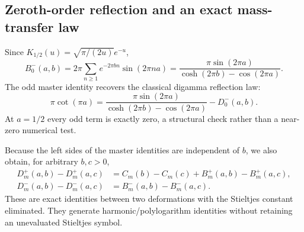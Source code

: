 \subsection{Zeroth-order reflection and an exact mass-transfer law}
Since $K_{1/2}(u)=\sqrt{\pi/(2u)}e^{-u}$,
\begin{equation}\label{qspec:eq:odd-zero}
B_0^-(a,b)=2\pi\sum_{n\ge1}e^{-2\pi bn}\sin(2\pi na)
=\frac{\pi\sin(2\pi a)}{\cosh(2\pi b)-\cos(2\pi a)}.
\end{equation}
The odd master identity recovers the classical digamma reflection law:
\begin{equation}\label{qspec:eq:zero-reflection}
\pi\cot(\pi a)=
\frac{\pi\sin(2\pi a)}{\cosh(2\pi b)-\cos(2\pi a)}-D_0^-(a,b).
\end{equation}
At $a=1/2$ every odd term is exactly zero, a structural check rather
than a near-zero numerical test.

Because the left sides of the master identities are independent of $b$,
we also obtain, for arbitrary $b,c>0$,
\begin{align}
D_m^+(a,b)-D_m^+(a,c)&=C_m(b)-C_m(c)+B_m^+(a,b)-B_m^+(a,c),\label{qspec:eq:transferplus}\\
D_m^-(a,b)-D_m^-(a,c)&=B_m^-(a,b)-B_m^-(a,c).
\label{qspec:eq:transferminus}
\end{align}
These are exact identities between two deformations with the Stieltjes
constant eliminated. They generate harmonic/polylogarithm identities
without retaining an unevaluated Stieltjes symbol.
